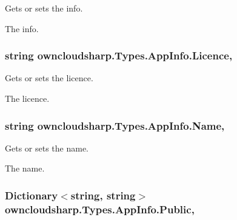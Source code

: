 Gets or sets the info. 

The info.\hypertarget{classowncloudsharp_1_1_types_1_1_app_info_ac7d38d4752320cee01dbae72f27dcc0c}{}
\subsubsection[{Licence}]{\setlength{\rightskip}{0pt plus 5cm}string owncloudsharp.\+Types.\+App\+Info.\+Licence\hspace{0.3cm}{\ttfamily [get]}, {\ttfamily [set]}}\label{classowncloudsharp_1_1_types_1_1_app_info_ac7d38d4752320cee01dbae72f27dcc0c}


Gets or sets the licence. 

The licence.\hypertarget{classowncloudsharp_1_1_types_1_1_app_info_a602c67891b544018cb2357ea16e55071}{}
\subsubsection[{Name}]{\setlength{\rightskip}{0pt plus 5cm}string owncloudsharp.\+Types.\+App\+Info.\+Name\hspace{0.3cm}{\ttfamily [get]}, {\ttfamily [set]}}\label{classowncloudsharp_1_1_types_1_1_app_info_a602c67891b544018cb2357ea16e55071}


Gets or sets the name. 

The name.\hypertarget{classowncloudsharp_1_1_types_1_1_app_info_a0b6d2de723405638ef59f17621b5f687}{}
\subsubsection[{Public}]{\setlength{\rightskip}{0pt plus 5cm}Dictionary$<$string, string$>$ owncloudsharp.\+Types.\+App\+Info.\+Public\hspace{0.3cm}{\ttfamily [get]}, {\ttfamily [set]}}\label{classowncloudsharp_1_1_types_1_1_app_info_a0b6d2de723405638ef59f17621b5f687}


